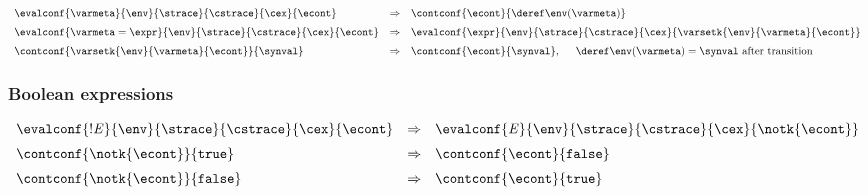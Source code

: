\documentclass{article}
\begin{document}
\[
  \begin{array}{lcl}
	\evalconf{\varmeta}{\env}{\strace}{\cstrace}{\cex}{\econt}
	& \Rightarrow &
	\contconf{\econt}{\deref\env(\varmeta)}\\[2mm]

	\evalconf{\varmeta = \expr}{\env}{\strace}{\cstrace}{\cex}{\econt}
	& \Rightarrow &
	\evalconf{\expr}{\env}{\strace}{\cstrace}{\cex}{\varsetk{\env}{\varmeta}{\econt}}\\[2mm]

	\contconf{\varsetk{\env}{\varmeta}{\econt}}{\synval}
	& \Rightarrow &
	\contconf{\econt}{\synval}, \hspace{5mm} \deref\env(\varmeta) = \synval \textrm{ after transition}

  \end{array}
\]

\subsubsection{Boolean expressions}
\newcommand{\true}{\tt{true}}
\newcommand{\false}{\tt{false}}

\[
  \begin{array}{lll}
	\evalconf{\Not{\expressionmeta}}{\env}{\strace}{\cstrace}{\cex}{\econt}
	& \Rightarrow &
	\evalconf{\expressionmeta}{\env}{\strace}{\cstrace}{\cex}{\notk{\econt}}\\[2mm]

	\contconf{\notk{\econt}}{\true}
	& \Rightarrow &
	\contconf{\econt}{\false}\\[2mm]

	\contconf{\notk{\econt}}{\false}
	& \Rightarrow &
	\contconf{\econt}{\true}
  \end{array}
\]
\end{document}
